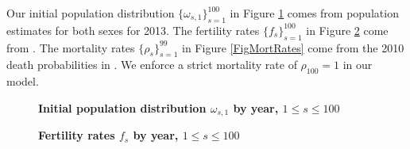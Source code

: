 \documentclass[letterpaper,12pt]{article}
\theoremstyle{definition}
\begin{document}
  Our initial population distribution $\{\omega_{s,1}\}_{s=1}^{100}$ in Figure \ref{FigInitPopDist} comes from \citet{Census:2014} population estimates for both sexes for 2013. The fertility rates $\{f_s\}_{s=1}^{100}$ in Figure \ref{FigFertRates} come from \citet[Table 1]{NVSR:2014}. The mortality rates $\{\rho_s\}_{s=1}^{99}$ in Figure \ref{FigMortRates} come from the 2010 death probabilities in \citet{SocSec:2010}. We enforce a strict mortality rate of $\rho_{100}=1$ in our model.

  \begin{figure}[htbp]\centering \captionsetup{width=4.0in}
    \caption{\label{FigInitPopDist}\textbf{Initial population distribution $\omega_{s,1}$ by year, $1\leq s\leq 100$}}
  \end{figure}

  \begin{figure}[htbp]\centering \captionsetup{width=4.0in}
    \caption{\label{FigFertRates}\textbf{Fertility rates $f_s$ by year, $1\leq s\leq 100$}}
  \end{figure}
\end{document}
